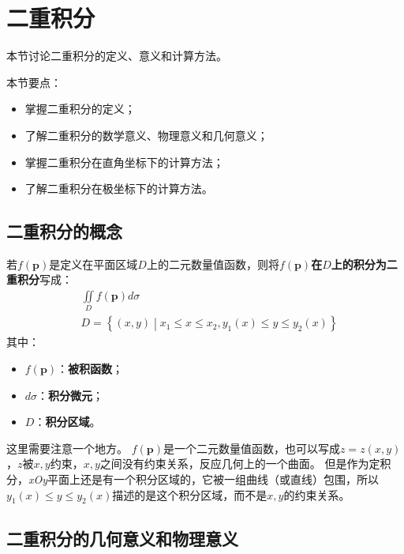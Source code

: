 \section{二重积分}

本节讨论二重积分的定义、意义和计算方法。

本节要点：
\begin{itemize}
    \item 掌握二重积分的定义；
    \item 了解二重积分的数学意义、物理意义和几何意义；
    \item 掌握二重积分在直角坐标下的计算方法；
    \item 了解二重积分在极坐标下的计算方法。
\end{itemize}

\subsection{二重积分的概念}

\begin{definition}[二重积分]
若$f\left( \boldsymbol{p} \right) $是定义在平面区域$D$上的二元数量值函数，则将{\bf $f\left( \boldsymbol{p} \right) $在$D$上的积分为二重积分}写成：
\begin{align*}
&\iint\limits_D{f\left( \boldsymbol{p} \right) d\sigma} \\
&D=\left\{ \left( x,y \right) \middle| x_1\leqslant x\leqslant x_2,y_1\left( x \right) \leqslant y\leqslant y_2\left( x \right) \right\}
\end{align*}
其中：
\begin{itemize}
    \item $f\left( \boldsymbol{p} \right) $：{\bf 被积函数}；
    \item $d\sigma$：{\bf 积分微元}；
    \item $D$：{\bf 积分区域}。
\end{itemize}
\end{definition}

这里需要注意一个地方。
$f\left( \boldsymbol{p} \right) $是一个二元数量值函数，也可以写成$z=z\left( x,y \right) $，$z$被$x,y$约束，$x,y$之间没有约束关系，反应几何上的一个曲面。
但是作为定积分，{\it xOy}平面上还是有一个积分区域的，它被一组曲线（或直线）包围，所以$y_1\left( x \right) \leqslant y\leqslant y_2\left( x \right) $描述的是这个积分区域，而不是$x,y$的约束关系。

\subsection{二重积分的几何意义和物理意义}

